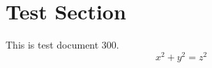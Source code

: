 \documentclass{article}
\begin{document}
\section{Test Section}
This is test document 300.
\begin{equation}
x^2 + y^2 = z^2
\end{equation}
\end{document}
